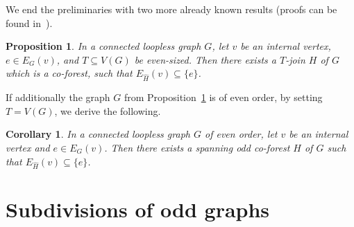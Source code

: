 \documentclass[a4paper,12pt]{article}
\newtheorem{corollary}[theorem]{Corollary}
\newtheorem{proposition}[theorem]{Proposition}
\numberwithin{equation}{section}
\begin{document}
 We end the preliminaries with two more already known results (proofs can be found in~\cite{Pet18}).

\begin{proposition}
    \label{co-forest}
In a connected loopless graph $G$, let $v$ be an internal vertex, $e\in E_G(v)$, and $T\subseteq V(G)$ be even-sized. Then there exists a $T$-join $H$ of $G$ which is a co-forest, such that $E_{\hat{H}}(v)\subseteq\{e\}$.
\end{proposition}

If additionally the graph $G$ from Proposition~\ref{co-forest} is of even order, by setting $T=V(G)$, we derive the following.
\begin{corollary}
    \label{odd co-forest}
   In a connected loopless graph $G$ of even order, let $v$ be an internal vertex and $e\in E_G(v)$. Then there exists a spanning odd co-forest $H$ of $G$ such that $E_{\hat{H}}(v)\subseteq\{e\}$.

\end{corollary}


\section{Subdivisions of odd graphs}
\end{document}
